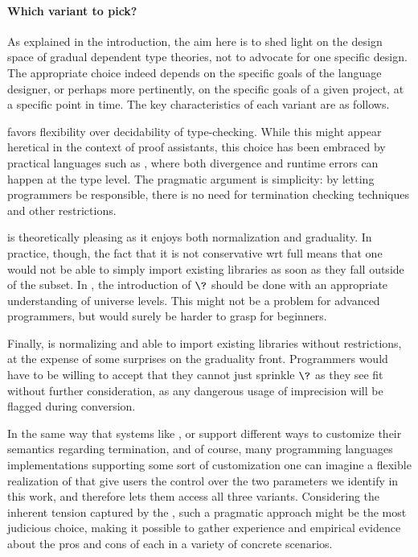\paragraph{Which variant to pick?}
As explained in the introduction, the aim here is to shed light on the design space of gradual
dependent type theories, not to advocate for one specific design.
%
The appropriate choice indeed depends on the specific goals of the language designer,
or perhaps more pertinently, on the specific goals of a given project,
at a specific point in time.
The key characteristics of each variant are as follows.

 favors flexibility over decidability of type-checking. While this might appear
heretical in the context of proof assistants, this choice has been embraced by practical languages such as  ,
where both divergence and runtime errors can happen at the type
level. The pragmatic argument is simplicity: by letting programmers be responsible,
there is no need for termination checking techniques and other restrictions.

 is theoretically pleasing as it enjoys both normalization and graduality.
In practice, though, the fact that it is not conservative wrt full  means that one would
not be able to simply import existing libraries as soon as they
fall outside of the  subset.
In , the introduction of $\?$ should be done with an appropriate understanding of
universe levels. This might not be a problem for advanced programmers,
but would surely be harder to grasp for beginners.

Finally,  is normalizing and able to import existing libraries without restrictions,
at the expense of some surprises on the graduality front.
Programmers would have to be willing to accept that they cannot just sprinkle $\?$
as they see fit without further consideration,
as any dangerous usage of imprecision will be flagged during conversion.

In the same way that systems like ,  or  support
different ways to customize their semantics regarding termination,%
and of course, many programming languages implementations supporting some sort of customization%
one can imagine a flexible realization of  that give users the control over the two
parameters we identify in this work, and therefore lets them access all three  variants.
%
Considering the inherent tension captured by the ,
such a pragmatic approach might be the most judicious choice,
making it possible to gather experience and empirical evidence about
the pros and cons of each in a variety of concrete scenarios.

